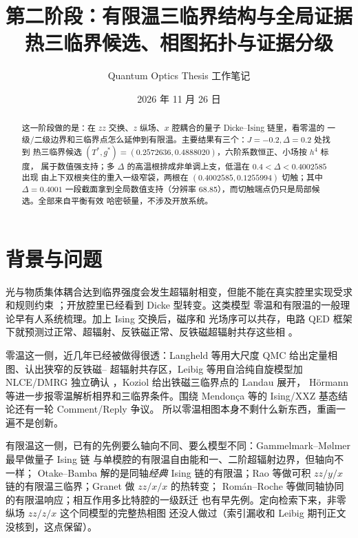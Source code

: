\documentclass[UTF8,11pt,a4paper]{ctexart}
\title{第二阶段：有限温三临界结构与全局证据\\[0.4em]
\large 热三临界候选、相图拓扑与证据分级}
\author{Quantum Optics Thesis 工作笔记}
\date{2026 年 11 月 26 日}
\begin{document}
\maketitle

\begin{abstract}
这一阶段做的是：在 $zz$ 交换、$z$ 纵场、$x$ 腔耦合的量子 Dicke--Ising 链里，看零温的
一级/二级边界和三临界点怎么延伸到有限温。主要结果有三个：$J=-0.2,\Delta=0.2$ 处找到
热三临界候选 $(T^\ast,g^\ast)=(0.2572636,0.4888020)$，六阶系数恒正、小场按 $h^4$ 标度，
属于数值强支持；多 $\Delta$ 的高温根排成非单调上支，低温在 $0.4<\Delta<0.4002585$ 出现
由上下双根夹住的重入一级窄袋，两根在 $(0.4002585,0.1255994)$ 切触；其中 $\Delta=0.4001$
一段截面拿到全局数值支持（分辨率 68.85），而切触端点仍只是局部候选。全部来自平衡有效
哈密顿量，不涉及开放系统。
\end{abstract}

\section{背景与问题}

光与物质集体耦合达到临界强度会发生超辐射相变，但能不能在真实腔里实现受求和规则约束
\cite{Nataf2010NoGo}；开放腔里已经看到 Dicke 型转变\cite{Baumann2010OpenDicke}。这类模型
零温和有限温的一般理论早有人系统梳理\cite{Peng2019Unified}。加上 Ising 交换后，磁序和
光场序可以共存，电路 QED 框架下就预测过正常、超辐射、反铁磁正常、反铁磁超辐射共存这些相
\cite{Zhang2014CircuitIsing}。

零温这一侧，近几年已经被做得很透：Langheld 等用大尺度 QMC 给出定量相图、认出狭窄的反铁磁--
超辐射共存区\cite{Langheld2025Wormhole}，Leibig 等用自洽纯自旋模型加 NLCE/DMRG 独立确认
\cite{Leibig2026SelfConsistent}，Koziol 给出铁磁三临界点的 Landau 展开\cite{Koziol2026Criticality}，
Hörmann 等进一步报零温解析相界和三临界条件\cite{Hormann2026Folds}。围绕 Mendonça 等的
Ising/XXZ 基态结论还有一轮 Comment/Reply 争议\cite{Mendonca2025Matter,Hormann2025Comment}。
所以零温相图本身不剩什么新东西，重画一遍不是创新。

有限温这一侧，已有的先例要么轴向不同、要么模型不同：Gammelmark--Mølmer 最早做量子 Ising 链
与单模腔的有限温自由能和一、二阶超辐射边界，但轴向不一样\cite{Gammelmark2011Thermal}；
Otake--Bamba 解的是同轴\emph{经典} Ising 链的有限温\cite{Otake2026FiniteT}；Rao 等做可积
$zz/y/x$ 链的有限温三临界\cite{Rao2025Unilateral}；Granet 做 $zz/x/x$ 的热转变\cite{Granet2023Exact}；
Román--Roche 等做同轴协同的有限温响应\cite{RomanRoche2021Photon}；相互作用多比特腔的一级跃迁
也有早先例\cite{Lee2004FirstOrder}。定向检索下来，非零纵场 $zz/z/x$ 这个同模型的完整热相图
还没人做过（索引漏收和 Leibig 期刊正文没核到，这点保留）。
\end{document}
